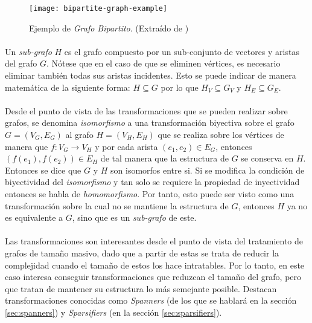 \documentclass{subfiles}
\begin{document}
      \begin{figure}
        \centering
        \texttt{[image: bipartite-graph-example]}
        \caption{Ejemplo de \emph{Grafo Bipartito}. (Extraído de \cite{wiki:Graph_(discrete_mathematics)})}
        \label{img:bipartite_graph_example}
      \end{figure}

      \paragraph{}
      Un \emph{sub-grafo} $H$ es el grafo compuesto por un sub-conjunto de vectores y aristas del grafo $G$. Nótese que en el caso de que se eliminen vértices, es necesario eliminar también todas sus aristas incidentes. Esto se puede indicar de manera matemática de la siguiente forma: $H \subseteq G$ por lo que $H_V \subseteq G_V$ y $H_E \subseteq G_E$.

      \paragraph{}
      Desde el punto de vista de las transformaciones que se pueden realizar sobre grafos, se denomina \emph{isomorfismo} a una transformación biyectiva sobre el grafo $G =(V_G, E_G)$ al grafo $H = (V_H, E_H)$ que se realiza sobre los vértices de manera que $f: V_G \rightarrow V_H$ y por cada arista $(e_1, e_2) \in E_G$, entonces $(f(e_1), f(e_2)) \in E_H$ de tal manera que la estructura de $G$ se conserva en $H$. Entonces se dice que $G$ y $H$ son isomorfos entre si. Si se modifica la condición de biyectividad del \emph{isomorfismo} y tan solo se requiere la propiedad de inyectividad entonces se habla de \emph{homomorfismo}. Por tanto, esto puede ser visto como una transformación sobre la cual no se mantiene la estructura de $G$, entonces $H$ ya no es equivalente a $G$, sino que es un \emph{sub-grafo} de este.

      \paragraph{}
      Las transformaciones son interesantes desde el punto de vista del tratamiento de grafos de tamaño masivo, dado que a partir de estas se trata de reducir la complejidad cuando el tamaño de estos los hace intratables. Por lo tanto, en este caso interesa conseguir transformaciones que reduzcan el tamaño del grafo, pero que tratan de mantener su estructura lo más semejante posible. Destacan transformaciones conocidas como \emph{Spanners} (de los que se hablará en la sección \ref{sec:spanners}) y \emph{Sparsifiers} (en la sección \ref{sec:sparsifiers}).
\end{document}
